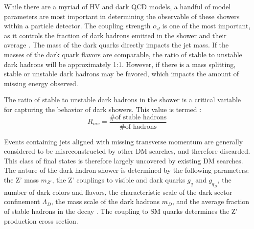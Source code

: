 While there are a myriad of HV and dark QCD models, a handful of model parameters are most important in determining the observable of these showers within a particle detector. The coupling strength $\alpha_d$ is one of the most important, as it controls the fraction of dark hadrons emitted in the shower and their average \pt. The mass of the dark quarks directly impacts the jet mass. If the masses of the dark quark flavors are comparable, the ratio of stable to unstable dark hadrons will be approximately 1:1. However, if there is a mass splitting, stable or unstable dark hadrons may be favored, which impacts the amount of missing energy observed. \par

The ratio of stable to unstable dark hadrons in the shower is a critical variable for capturing the behavior of dark showers. This value is termed \rinv:
\begin{equation}
	R_{inv} = \frac{\textrm{\# of stable hadrons}}{\textrm{\# of hadrons}}
\end{equation}

Events containing jets aligned with missing transverse momentum are generally considered to be misreconstructed by other DM searches, and therefore discarded. This class of final states is therefore largely uncovered by existing DM searches. The nature of the dark hadron shower is determined by the following parameters: the Z' mass $m_{Z'}$, the Z' couplings to visible and dark quarks $g_q$ and $g_{q_D}$, the number of dark colors and flavors, the characteristic scale of the dark sector confinement $\Lambda_D$, the mass scale of the dark hadrons $m_D$, and the average fraction of stable hadrons in the decay \rinv. The coupling to SM quarks determines the Z' production cross section.

